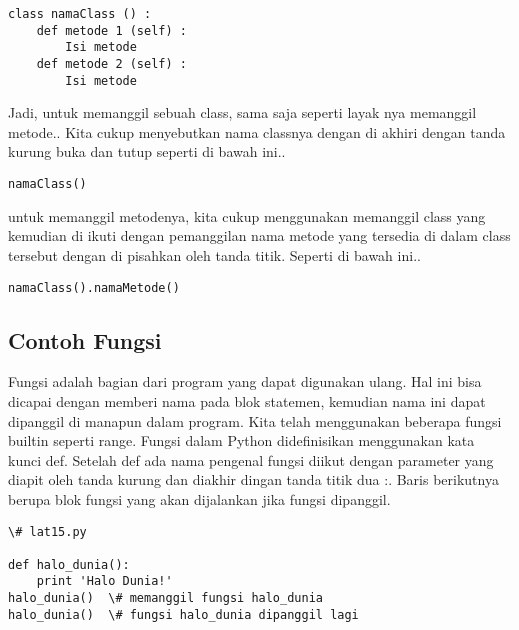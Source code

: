 \begin{verbatim}
class namaClass () :
    def metode 1 (self) :
        Isi metode
    def metode 2 (self) :
        Isi metode
\end{verbatim}

Jadi, untuk memanggil sebuah class, sama saja seperti layak nya memanggil metode.. Kita cukup menyebutkan nama classnya 
dengan di akhiri dengan tanda kurung buka dan tutup seperti di bawah ini..

\begin{verbatim}
namaClass()
\end{verbatim}

untuk memanggil metodenya, kita cukup menggunakan memanggil class yang kemudian di ikuti dengan pemanggilan nama metode yang 
tersedia di dalam class tersebut dengan di pisahkan oleh tanda titik. Seperti di bawah ini..

\begin{verbatim}
namaClass().namaMetode()
\end{verbatim}

\subsection{Contoh Fungsi}
Fungsi adalah bagian dari program yang dapat digunakan ulang. Hal ini bisa dicapai dengan memberi nama pada blok statemen,
kemudian nama ini dapat dipanggil di manapun dalam program. Kita telah menggunakan beberapa fungsi builtin seperti range.
Fungsi dalam Python didefinisikan menggunakan kata kunci def. Setelah def ada nama pengenal fungsi diikut dengan parameter
yang diapit oleh tanda kurung dan diakhir dingan tanda titik dua :. Baris berikutnya berupa blok fungsi yang akan dijalankan 
jika fungsi dipanggil.

\begin{verbatim}
\# lat15.py

def halo_dunia():
    print 'Halo Dunia!'
halo_dunia()  \# memanggil fungsi halo_dunia
halo_dunia()  \# fungsi halo_dunia dipanggil lagi
\end{verbatim}



